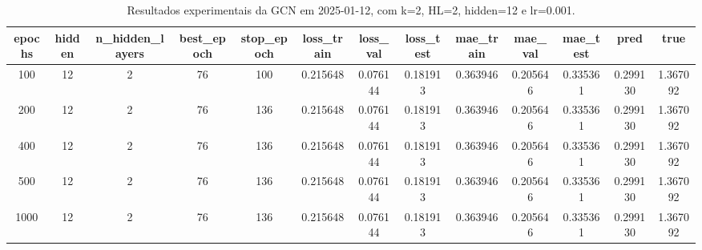 \begin{table}[h]
\centering
\caption{Resultados experimentais da GCN em 2025-01-12, com k=2, HL=2, hidden=12 e lr=0.001.}
\label{tab:gcn_results_k2_hl2_h12_d20250112}
\begin{tabular}{ccccccccccccc}
\toprule
epochs & hidden & n\_hidden\_layers & best\_epoch & stop\_epoch & loss\_train & loss\_val & loss\_test & mae\_train & mae\_val & mae\_test & pred & true \\
\midrule
100 & 12 & 2 & 76 & 100 & 0.215648 & 0.076144 & 0.181913 & 0.363946 & 0.205646 & 0.335361 & 0.299130 & 1.367092 \\
200 & 12 & 2 & 76 & 136 & 0.215648 & 0.076144 & 0.181913 & 0.363946 & 0.205646 & 0.335361 & 0.299130 & 1.367092 \\
400 & 12 & 2 & 76 & 136 & 0.215648 & 0.076144 & 0.181913 & 0.363946 & 0.205646 & 0.335361 & 0.299130 & 1.367092 \\
500 & 12 & 2 & 76 & 136 & 0.215648 & 0.076144 & 0.181913 & 0.363946 & 0.205646 & 0.335361 & 0.299130 & 1.367092 \\
1000 & 12 & 2 & 76 & 136 & 0.215648 & 0.076144 & 0.181913 & 0.363946 & 0.205646 & 0.335361 & 0.299130 & 1.367092 \\
\bottomrule
\end{tabular}
\end{table}

